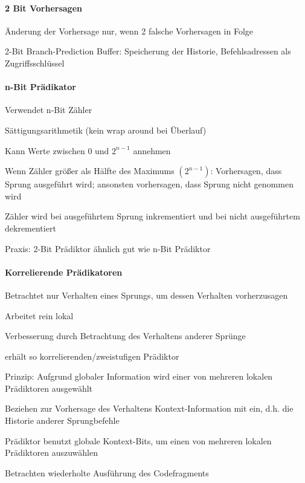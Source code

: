 \documentclass[10pt,landscape]{article}
\begin{document}
\begin{multicols}{3}
  \paragraph{ 2 Bit Vorhersagen}
  \begin{itemize*}
    \item Änderung der Vorhersage nur, wenn 2 falsche Vorhersagen in Folge
    \item 2-Bit Branch-Prediction Buffer: Speicherung der Historie, Befehlsadressen als Zugriffsschlüssel
  \end{itemize*}
  
  
  \paragraph{ n-Bit Prädikator}
  \begin{itemize*}
    \item Verwendet n-Bit Zähler
    \item Sättigungsarithmetik (kein wrap around bei Überlauf)
    \item Kann Werte zwischen $0$ und $2^{n-1}$ annehmen
    \item Wenn Zähler größer als Hälfte des Maximums $(2^{n-1})$: Vorhersagen, dass Sprung ausgeführt wird; ansonsten vorhersagen, dass Sprung nicht genommen wird
    \item Zähler wird bei ausgeführtem Sprung inkrementiert und bei nicht ausgeführtem dekrementiert
    \item Praxis: 2-Bit Prädiktor ähnlich gut wie n-Bit Prädiktor
  \end{itemize*}
  
  \paragraph{ Korrelierende Prädikatoren}
  \begin{itemize*}
    \item Betrachtet nur Verhalten eines Sprungs, um dessen Verhalten vorherzusagen
    \item Arbeitet rein lokal
    \item Verbesserung durch Betrachtung des Verhaltens anderer Sprünge
    \item erhält so korrelierenden/zweistufigen Prädiktor
    \item Prinzip: Aufgrund globaler Information wird einer von mehreren lokalen Prädiktoren ausgewählt
    \item Beziehen zur Vorhersage des Verhaltens Kontext-Information mit ein, d.h. die Historie anderer Sprungbefehle
    \item Prädiktor benutzt globale Kontext-Bits, um einen von mehreren lokalen Prädiktoren auszuwählen
    \item Betrachten wiederholte Ausführung des Codefragments
  \end{itemize*}
  

\end{multicols}
\end{document}
